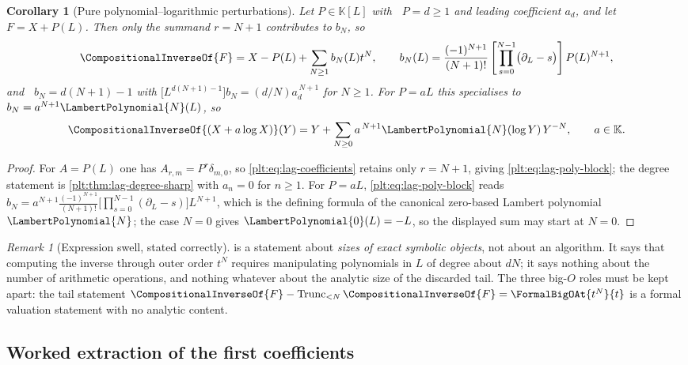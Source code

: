 \documentclass[11pt,oneside]{article}
\theoremstyle{plain}
\newtheorem{corollary}[theorem]{Corollary}
\theoremstyle{definition}
\theoremstyle{remark}
\newtheorem{remark}[theorem]{Remark}
\newcommand{\K}{\mathbb{K}}
\DeclareMathOperator{\degL}{deg_{L}}
\newcommand{\Trunc}[2]{\operatorname{Trunc}_{<#2}#1}     %
\newcommand{\rev}[1]{\CompositionalInverseOf{#1}}
\newcommand{\LamP}[1]{\LambertPolynomial{#1}}
\begin{document}
\begin{corollary}[Pure polynomial--logarithmic perturbations]
\label{plt:cor:lag-poly-perturbation}
Let \(P\in\K[L]\) with \(\degL P=d\ge1\) and leading coefficient \(a_d\), and
let \(F=X+P(L)\).  Then only the summand \(r=N+1\) contributes to \(b_N\), so
\begin{equation}
\label{plt:eq:lag-poly-block}
  \rev{F}=X-P(L)+\sum_{N\ge1}b_N(L)t^N,
  \qquad
  b_N(L)=\frac{(-1)^{N+1}}{(N+1)!}
   \left[\prod_{s=0}^{N-1}\bigl(\partial_L-s\bigr)\right]P(L)^{N+1},
\end{equation}
and \(\degL b_N=d(N+1)-1\) with
\(\bigl[L^{d(N+1)-1}\bigr]b_N=(d/N)a_d^{\,N+1}\) for \(N\ge1\).  For
\(P=aL\) this specialises to \(b_N=a^{N+1}\LamP{N}(L)\), so
\begin{equation}
\label{plt:eq:lag-scaled-lambert}
  \rev{(X+a\log X)}(Y)=Y+\sum_{N\ge0}a^{\,N+1}\LamP{N}(\log Y)\,Y^{-N},
  \qquad a\in\K .
\end{equation}
\end{corollary}

\begin{proof}
For \(A=P(L)\) one has \(A_{r,m}=P^r\delta_{m,0}\), so
\cref{plt:eq:lag-coefficients} retains only \(r=N+1\), giving
\cref{plt:eq:lag-poly-block}; the degree statement is
\cref{plt:thm:lag-degree-sharp} with \(a_n=0\) for \(n\ge1\).  For \(P=aL\),
\cref{plt:eq:lag-poly-block} reads
\(b_N=a^{N+1}\frac{(-1)^{N+1}}{(N+1)!}\bigl[\prod_{s=0}^{N-1}(\partial_L-s)\bigr]L^{N+1}\),
which is the defining formula of the canonical zero-based Lambert polynomial
\(\LamP{N}\); the case \(N=0\) gives \(\LamP{0}(L)=-L\), so the displayed sum
may start at \(N=0\).
\end{proof}

\begin{remark}[Expression swell, stated correctly]
\label{plt:rmk:lag-swell}
 is a statement about \emph{sizes of exact
symbolic objects}, not about an algorithm.  It says that computing the inverse
through outer order \(t^N\) requires manipulating polynomials in \(L\) of degree
about \(dN\); it says nothing about the number of arithmetic operations, and
nothing whatever about the analytic size of the discarded tail.  The three
big-\(O\) roles must be kept apart: the tail statement
\(\rev{F}-\Trunc{\rev{F}}{N}=\FormalBigOAt{t^N}{t}\) is a formal valuation
statement with no analytic content.
\end{remark}

\subsection{Worked extraction of the first coefficients}
\label{plt:sec:lag-worked}
\end{document}

